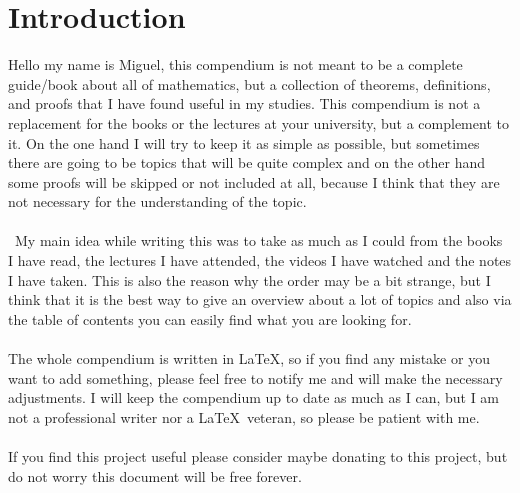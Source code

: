 \section{Introduction}

Hello my name is Miguel, this compendium is not meant to be a complete 
guide/book about all of mathematics,
but a collection of theorems, definitions, and proofs that I have found useful in my studies.
This compendium is not a replacement for the books or the lectures at your university, but a complement to it.
On the one hand I will try to keep it as simple as possible, but sometimes there are going to be topics 
that will be quite 
complex and on the other hand some proofs will be 
skipped or not included at all, because I think that they 
are not necessary for the understanding of the topic.
\\\\\
My main idea while writing this was to take as much as I could from the books I have read, the lectures 
I have attended, the videos I have watched 
and the notes I have taken. This is also the reason why the order may be a bit strange, 
but I think that it is the best way to give an overview about a lot of topics and also 
via the table of contents you can
easily find what you are looking for.
\\\\
The whole compendium is written in \LaTeX, so if you find any mistake or you want to add something, please 
feel free to notify me and will make the necessary adjustments.
I will keep the compendium up to date as much as 
I can, but I am not a professional writer nor a \LaTeX\ veteran, so please be patient with me.
\\\\
If you find this project useful please consider maybe donating
to this project, but do not worry this document will be free forever.

\newpage